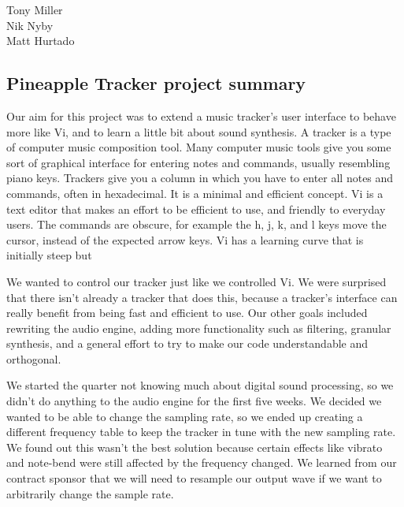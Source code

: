 \documentclass[12pt,letterpaper]{article}
\begin{document}
\begin{flushright}
Tony Miller\\
Nik Nyby\\
Matt Hurtado
\end{flushright}

\begin{center}
\section*{Pineapple Tracker project summary}
\end{center}


\doublespacing
\par
Our aim for this project was to extend a music tracker's user interface to behave more like Vi, and to learn a little bit about sound synthesis. A tracker is a type of computer music composition tool. Many computer music tools give you some sort of graphical interface for entering notes and commands, usually resembling piano keys. Trackers give you a column in which you have to enter all notes and commands, often in hexadecimal. It is a minimal and efficient concept. Vi is a text editor that makes an effort to be efficient to use, and friendly to everyday users. The commands are obscure, for example the h, j, k, and l keys move the cursor, instead of the expected arrow keys. Vi has a learning curve that is initially steep but 

\par
We wanted to control our tracker just like we controlled Vi. We were surprised that there isn't already a tracker that does this, because a tracker's interface can really benefit from being fast and efficient to use. Our other goals included rewriting the audio engine, adding more functionality such as filtering, granular synthesis, and a general effort to try to make our code understandable and orthogonal.

\par
We started the quarter not knowing much about digital sound processing, so we didn't do anything to the audio engine for the first five weeks. We decided we wanted to be able to change the sampling rate, so we ended up creating a different frequency table to keep the tracker in tune with the new sampling rate. We found out this wasn't the best solution because certain effects like vibrato and note-bend were still affected by the frequency changed. We learned from our contract sponsor that we will need to resample our output wave if we want to arbitrarily change the sample rate.
\end{document}
